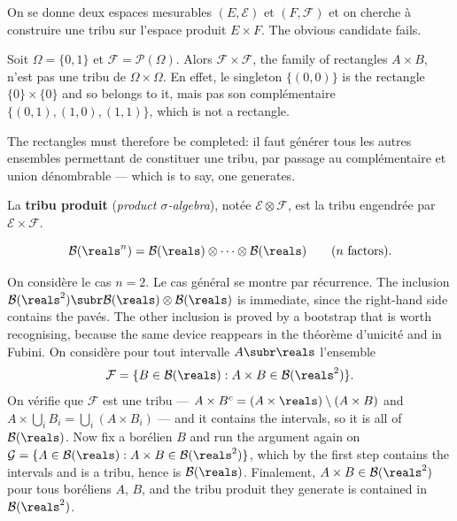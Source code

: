 On se donne deux espaces mesurables $(E,\mathcal{E})$ et $(F,\mathcal{F})$ et on
cherche à construire une tribu sur l'espace produit $E \times F$. The obvious
candidate fails.

\begin{example}
  Soit $\Omega = \{0,1\}$ et $\mathcal{F} = \mathcal{P}(\Omega)$. Alors $\mathcal{F}
  \times \mathcal{F}$, the family of rectangles $A \times B$, n'est pas une tribu de
  $\Omega \times \Omega$. En effet, le singleton $\{(0,0)\}$ is the rectangle $\{0\}
  \times \{0\}$ and so belongs to it, mais pas son complémentaire
  $\{(0,1),(1,0),(1,1)\}$, which is not a rectangle.
\end{example}

The rectangles must therefore be completed: il faut générer tous les autres
ensembles permettant de constituer une tribu, par passage au complémentaire et union
dénombrable --- which is to say, one generates.

\begin{definition}
  La \textbf{tribu produit} (\textit{product $\sigma$-algebra}), notée $\mathcal{E}
  \otimes \mathcal{F}$, est la tribu engendrée par $\mathcal{E} \times \mathcal{F}$.
\end{definition}

\begin{theorem}
  \[
    \mathcal{B}(\reals^{n}) = \mathcal{B}(\reals) \otimes \cdots \otimes
    \mathcal{B}(\reals) \qquad (n \text{ factors}).
  \]
\end{theorem}

\begin{proofsketch}
  On considère le cas $n = 2$. Le cas général se montre par récurrence. The
  inclusion $\mathcal{B}(\reals^{2}) \subr \mathcal{B}(\reals) \otimes
  \mathcal{B}(\reals)$ is immediate, since the right-hand side contains the pavés.
  The other inclusion is proved by a bootstrap that is worth recognising, because the
  same device reappears in the théorème d'unicité and in Fubini. On considère pour
  tout intervalle $A \subr \reals$ l'ensemble
  \[
    \mathcal{F} = \{B \in \mathcal{B}(\reals) : A \times B \in
    \mathcal{B}(\reals^{2})\}.
  \]
  On vérifie que $\mathcal{F}$ est une tribu --- $A \times B^{c} = (A \times \reals)
  \setminus (A \times B)$ and $A \times \bigcup_{i} B_{i} = \bigcup_{i} (A \times
  B_{i})$ --- and it contains the intervals, so it is all of $\mathcal{B}(\reals)$.
  Now fix a borélien $B$ and run the argument again on $\mathcal{G} = \{A \in
  \mathcal{B}(\reals) : A \times B \in \mathcal{B}(\reals^{2})\}$, which by the first
  step contains the intervals and is a tribu, hence is $\mathcal{B}(\reals)$.
  Finalement, $A \times B \in \mathcal{B}(\reals^{2})$ pour tous boréliens $A$, $B$,
  and the tribu produit they generate is contained in $\mathcal{B}(\reals^{2})$.
\end{proofsketch}

